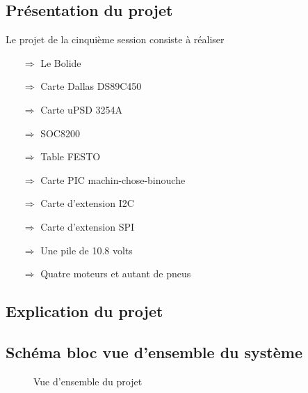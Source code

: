 \documentclass[10pt,a4paper,final]{article}
\begin{document}
\renewcommand\footrulewidth{1pt}
\fancyfoot[R]{\today}
\begin{spacing}{1.5}

\section{Présentation du projet}
Le projet de la cinquième session consiste à réaliser
\begin{itemize}
\item[$\Rightarrow$] Le Bolide
\item[$\Rightarrow$] Carte Dallas DS89C450
\item[$\Rightarrow$] Carte uPSD 3254A
\item[$\Rightarrow$] SOC8200
\item[$\Rightarrow$] Table FESTO
\item[$\Rightarrow$] Carte PIC machin-chose-binouche
\item[$\Rightarrow$] Carte d'extension I{\small 2}C
\item[$\Rightarrow$] Carte d'extension SPI
\item[$\Rightarrow$] Une pile de 10.8 volts
\item[$\Rightarrow$] Quatre moteurs et autant de pneus
\end{itemize}

\subsection{Explication du projet}

\subsection{Schéma bloc vue d'ensemble du système}

\begin{figure}[hbtp]
\caption{Vue d'ensemble du projet}
\centering
{}
\end{figure}
\vfill
\pagebreak 


\end{spacing}
\end{document}
